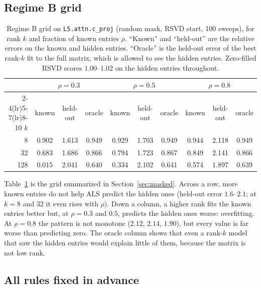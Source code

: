 \documentclass[10pt]{article}
\theoremstyle{plain}
\theoremstyle{definition}
\theoremstyle{remark}
\newcommand{\mtx}[1]{\texttt{#1}}
\begin{document}
\subsection{Regime B grid}

\begin{table}[!htb]
\centering\small
\begin{tabular*}{\textwidth}{@{\extracolsep{\fill}}r *{9}{c}@{}}
\toprule
 & \multicolumn{3}{c}{$\rho=0.3$} & \multicolumn{3}{c}{$\rho=0.5$} & \multicolumn{3}{c}{$\rho=0.8$}\\
\cmidrule(lr){2-4}\cmidrule(lr){5-7}\cmidrule(lr){8-10}
$k$ & known & held-out & oracle & known & held-out & oracle & known & held-out & oracle\\
\midrule
8 & 0.902 & 1.613 & 0.949 & 0.929 & 1.703 & 0.949 & 0.944 & 2.118 & 0.949\\
32 & 0.683 & 1.686 & 0.866 & 0.794 & 1.723 & 0.867 & 0.849 & 2.141 & 0.866\\
128 & 0.015 & 2.041 & 0.640 & 0.334 & 2.102 & 0.641 & 0.574 & 1.897 & 0.639\\
\bottomrule
\end{tabular*}
\caption{Regime B grid on \mtx{L5.attn.c\_proj} (random mask, RSVD start, 100 sweeps), for rank $k$ and fraction of known entries $\rho$. ``Known'' and ``held-out'' are the relative errors on the known and hidden entries. ``Oracle'' is the held-out error of the best rank-$k$ fit to the full matrix, which is allowed to see the hidden entries. Zero-filled RSVD scores $1.00$--$1.02$ on the hidden entries throughout.}
\label{tab:grid}
\end{table}

Table~\ref{tab:grid} is the grid summarized in Section~\ref{sec:masked}. Across a row, more known entries do not help ALS predict the hidden ones (held-out error $1.6$--$2.1$; at $k=8$ and $32$ it even rises with $\rho$). Down a column, a higher rank fits the known entries better but, at $\rho=0.3$ and $0.5$, predicts the hidden ones worse: overfitting. At $\rho=0.8$ the pattern is not monotone ($2.12$, $2.14$, $1.90$), but every value is far worse than predicting zero. The oracle column shows that even a rank-$k$ model that saw the hidden entries would explain little of them, because the matrix is not low rank.

\subsection{All rules fixed in advance}
\label{app:rules}
\end{document}

